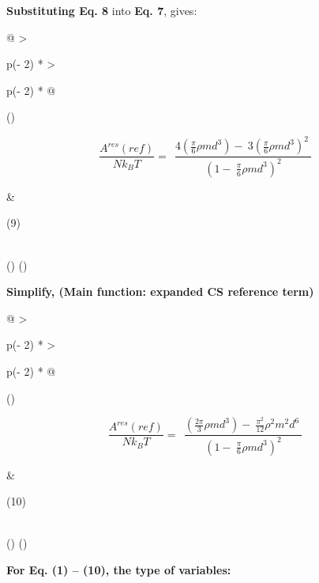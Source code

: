 \documentclass[
]{article}
\begin{document}
\textbf{Substituting Eq. 8} into \textbf{Eq. 7}, gives:

\begin{longtable}[]{@{}
  >{\raggedright\arraybackslash}p{(\columnwidth - 2\tabcolsep) * }
  >{\raggedright\arraybackslash}p{(\columnwidth - 2\tabcolsep) * }@{}}
\toprule()
\begin{minipage}[b]{\linewidth}\raggedright
\[\frac{A^{res}(ref)}{Nk_{B}T} = \ \ \frac{4(\frac{\pi}{6}\rho md^{3}) - \ 3{(\frac{\pi}{6}\rho md^{3})}^{2}\ }{\left( 1 - \ \frac{\pi}{6}\rho md^{3} \right)^{2}}\]
\end{minipage} & \begin{minipage}[b]{\linewidth}\raggedright
(9)
\end{minipage} \\
\midrule()
\endhead
\bottomrule()
\end{longtable}

\textbf{Simplify, (Main function: expanded CS reference term)}

\begin{longtable}[]{@{}
  >{\raggedright\arraybackslash}p{(\columnwidth - 2\tabcolsep) * }
  >{\raggedright\arraybackslash}p{(\columnwidth - 2\tabcolsep) * }@{}}
\toprule()
\begin{minipage}[b]{\linewidth}\raggedright
\[\frac{A^{res}(ref)}{Nk_{B}T} = \ \ \frac{(\frac{2\pi}{3}\rho md^{3}) - \ \frac{\pi^{2}}{12}\rho^{2}m^{2}d^{6}\ }{\left( 1 - \ \frac{\pi}{6}\rho md^{3} \right)^{2}}\]
\end{minipage} & \begin{minipage}[b]{\linewidth}\raggedright
(10)
\end{minipage} \\
\midrule()
\endhead
\bottomrule()
\end{longtable}

\textbf{For Eq. (1) -- (10), the type of variables:}
\end{document}
